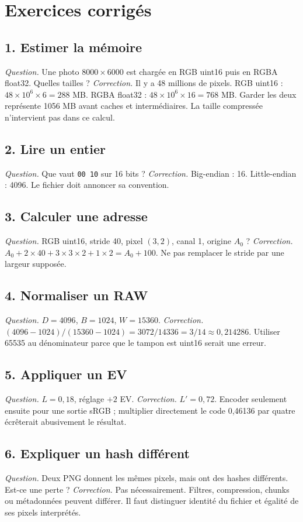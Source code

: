 \section{Exercices corrigés}
\subsection*{1. Estimer la mémoire}
\emph{Question.} Une photo $8000\times6000$ est chargée
en RGB uint16 puis en RGBA float32. Quelles tailles ?
\emph{Correction.} Il y a 48 millions de pixels.
RGB uint16 : $48\times10^6\times6=288$ MB.
RGBA float32 : $48\times10^6\times16=768$ MB.
Garder les deux représente 1056 MB avant caches
et intermédiaires. La taille compressée n'intervient
pas dans ce calcul.

\subsection*{2. Lire un entier}
\emph{Question.} Que vaut \texttt{00 10} sur 16 bits ?
\emph{Correction.} Big-endian : 16. Little-endian :
4096. Le fichier doit annoncer sa convention.

\subsection*{3. Calculer une adresse}
\emph{Question.} RGB uint16, stride 40, pixel $(3,2)$,
canal 1, origine $A_0$ ?
\emph{Correction.} $A_0+2\times40+3\times3\times2+
1\times2=A_0+100$. Ne pas remplacer le stride
par une largeur supposée.

\subsection*{4. Normaliser un RAW}
\emph{Question.} $D=4096$, $B=1024$, $W=15360$.
\emph{Correction.} $(4096-1024)/(15360-1024)
=3072/14336=3/14\approx0{,}214286$.
Utiliser 65535 au dénominateur parce que le
tampon est uint16 serait une erreur.

\subsection*{5. Appliquer un EV}
\emph{Question.} $L=0{,}18$, réglage $+2$ EV.
\emph{Correction.} $L'=0{,}72$. Encoder seulement
ensuite pour une sortie sRGB ; multiplier
directement le code 0,46136 par quatre écrêterait
abusivement le résultat.

\subsection*{6. Expliquer un hash différent}
\emph{Question.} Deux PNG donnent les mêmes pixels,
mais ont des hashes différents. Est-ce une perte ?
\emph{Correction.} Pas nécessairement. Filtres,
compression, chunks ou métadonnées peuvent différer.
Il faut distinguer identité du fichier et égalité
de ses pixels interprétés.

